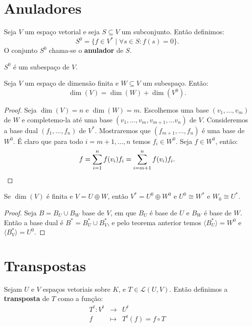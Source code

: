 \documentclass[11pt,twoside,a4paper]{book}
\begin{document}
\section{Anuladores}

\begin{definicao}
Seja $V$ um espaço vetorial e seja $S\subseteq V$ um subconjunto. Então definimos:
\[
S^0=\{f\in V^*\mid\forall s\in S:f(s)=0\}.
\]
O conjunto $S^0$ chama-se o \textbf{anulador} de $S$.
\end{definicao}

\begin{proposicao}
$S^0$ é um subespaço de $V$.
\end{proposicao}

\begin{teorema}
Seja $V$ um espaço de dimensão finita e $W\subseteq V$ um subespaço. Então:
\[
\dim(V)=\dim(W)+\dim(V^0).
\]
\end{teorema}
\begin{proof}
Seja $\dim(V)=n$ e $\dim(W)=m$. Escolhemos uma base $(v_1,\dots,v_m)$ de $W$ e completemo-la até uma base $(v_1,\dots,v_m,v_{m+1},\dots v_n)$ de $V$. Consideremos a base dual $(f_1,\dots,f_n)$ de $V^*$. Mostraremos que $(f_{m+1},\dots,f_n)$ é uma base de $W^0$. É claro que para todo $i=m+1,\dots,n$ temos $f_i\in W^0$. Seja $f\in W^0$, então:
\[
f=\sum_{i=1}^nf(v_i)f_i=\sum_{i=m+1}^nf(v_i)f_i. \qedhere
\]
\end{proof}

\begin{teorema}
Se $\dim(V)$ é finita e $V=U\oplus W$, então $V^*=U^0\oplus W^0$ e $U^0\cong W^*$ e $W_0\cong U^*$.
\end{teorema}
\begin{proof}
Seja $B=B_U\cup B_W$ base de $V$, em que $B_U$ é base de $U$ e $B_W$ é base de $W$. Então a base dual é $B^*=B_U^*\cup B_V^*$, e pelo teorema anterior temos $\langle B_U^*\rangle=W^0$ e $\langle B_V^*\rangle=U^0$.
\end{proof}

\section{Transpostas}

\begin{definicao}
Sejam $U$ e $V$ espaços vetoriais sobre $K$, e $T\in\mathcal{L}(U,V)$. Então definimos a \textbf{transposta} de $T$ como a função:
\[
\begin{array}{rcl}
T^t:V^t&\rightarrow&U^t\\f&\mapsto&T^t(f)=f\circ T
\end{array}
\]
\end{definicao}
\end{document}
